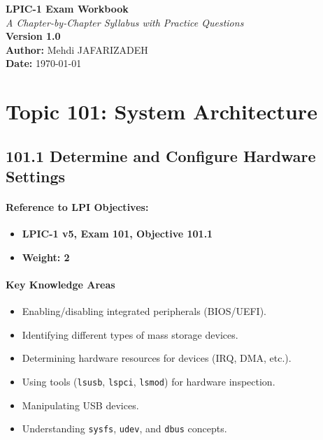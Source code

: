 \documentclass[12pt,a4paper]{report}
\begin{document}
\begin{titlepage}
    \centering
    \vspace*{3cm}
    {\Huge \textbf{LPIC-1 Exam Workbook}}\\
    \vspace{1cm}
    {\large \textit{A Chapter-by-Chapter Syllabus with Practice Questions}}\\
    \vfill
    {\large \textbf{Version 1.0}}\\
    \vspace{2cm}
    \vfill
    \textbf{Author:} Mehdi JAFARIZADEH \\
    \textbf{Date:} \today
    \vspace{2cm}
\end{titlepage}

\tableofcontents
\newpage

\chapter{Topic 101: System Architecture}

\section{101.1 Determine and Configure Hardware Settings}

\subsubsection*{Reference to LPI Objectives:}
\begin{itemize}
    \item \textbf{LPIC-1 v5, Exam 101, Objective 101.1}
    \item \textbf{Weight: 2}
\end{itemize}

\subsubsection*{Key Knowledge Areas}
\begin{itemize}
    \item Enabling/disabling integrated peripherals (BIOS/UEFI).
    \item Identifying different types of mass storage devices.
    \item Determining hardware resources for devices (IRQ, DMA, etc.).
    \item Using tools (\texttt{lsusb}, \texttt{lspci}, \texttt{lsmod}) for hardware inspection.
    \item Manipulating USB devices.
    \item Understanding \texttt{sysfs}, \texttt{udev}, and \texttt{dbus} concepts.
\end{itemize}
\end{document}
